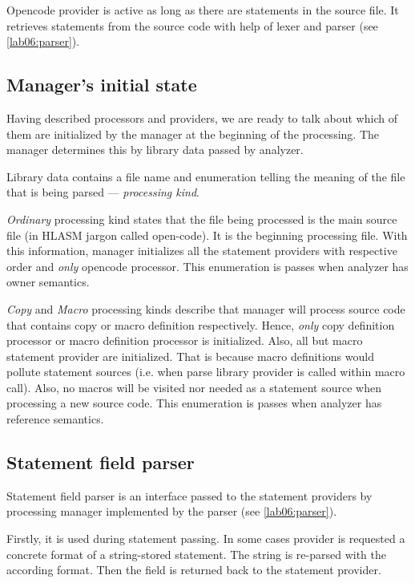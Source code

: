 Opencode provider is active as long as there are statements in the source file. It retrieves statements from the source code with help of lexer and parser (see \cref{lab06:parser}).

\subsection{Manager's initial state}
\label{lab06:lib_data}
Having described processors and providers, we are ready to talk about which of them are initialized by the manager at the beginning of the processing. The manager determines this by library data passed by analyzer.

Library data contains a file name and enumeration telling the meaning of the file that is being parsed --- \emph{processing kind}.

\emph{Ordinary} processing kind states that the file being processed is the main source file (in HLASM jargon called open-code). It is the beginning processing file. With this information, manager initializes all the statement providers with respective order and \emph{only} opencode processor. This enumeration is passes when analyzer has owner semantics.

\emph{Copy} and \emph{Macro} processing kinds describe that manager will process source code that contains copy or macro definition respectively. Hence, \emph{only} copy  definition processor or macro definition processor is initialized. Also, all but macro statement provider are initialized. That is because macro definitions would pollute statement sources (i.e. when parse library provider is called within macro call). Also, no macros will be visited nor needed as a statement source when processing a new source code. This enumeration is passes when analyzer has reference semantics.


\subsection{Statement field parser}
\label{lab06:field_parser}

Statement field parser is an interface passed to the statement providers by processing manager implemented by the parser (see \cref{lab06:parser}).

Firstly, it is used during statement passing. In some cases provider is requested a concrete format of a string-stored statement. The string is re-parsed with the according format. Then the field is returned back to the statement provider. 

